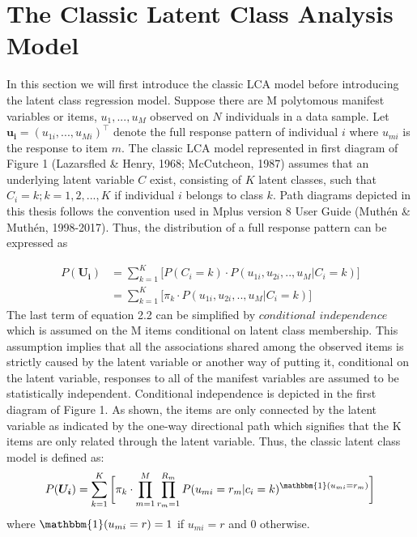 \section{The Classic Latent Class Analysis Model}
In this section we will first introduce the classic LCA model before introducing the latent class regression model. Suppose there are M polytomous manifest variables or items, $u_{1},...,u_{M}$ observed on $N$ individuals in a data sample. Let $\bm{u_{i}} = (u_{1i},...,u_{Mi})^{\intercal}$ denote the full response pattern of individual $i$ where $u_{mi}$ is the response to item $m$. The classic LCA model represented in first diagram of Figure 1 (Lazarsfled \& Henry, 1968; McCutcheon, 1987) assumes that an underlying latent variable $C$ exist, consisting of $K$ latent classes, such that $C_{i}=k; k=1,2,...,K$ if individual $i$ belongs to class $k$. Path diagrams depicted in this thesis follows the convention used in Mplus version 8 User Guide (Muth\'en \& Muth\'en, 1998-2017). Thus, the distribution of a full response pattern can be expressed as 

\begin{align}
P(\bm{U_{i}}) &= \sum_{k=1}^{K} \bigg[ P(C_{i}=k) \cdot P(u_{1i},u_{2i},..,u_{M}|C_{i}=k)\bigg] \\
&=\sum_{k=1}^{K} \bigg[ \pi_{k} \cdot P(u_{1i},u_{2i},..,u_{M}|C_{i}=k)\bigg]
\end{align}
The last term of equation 2.2 can be simplified by $conditional$ $independence$ which is assumed on the M items conditional on latent class membership. This assumption implies that all the associations shared among the observed items is strictly caused by the latent variable or another way of putting it, conditional on the latent variable, responses to all of the manifest variables are assumed to be statistically independent. Conditional independence is depicted in the first diagram of Figure 1. As shown, the items are only connected by the latent variable as indicated by the one-way directional path which signifies that the K items are only related through the latent variable. Thus, the classic latent class model is defined as: 
\begin{align}
P(\bm{U_{i}}) = \sum_{k=1}^{K} \bigg[ \pi_{k} \cdot  \prod_{m=1}^{M}\prod_{r_{m}=1}^{R_{m}} P(u_{mi}=r_{m}|c_{i}=k)^{\mathbbm{1}(u_{mi} = r_{m})} \bigg ]
\end{align}
where $\mathbbm{1}(u_{mi} = r)=1$ if $u_{mi}=r$ and $0$ otherwise.

%
%


